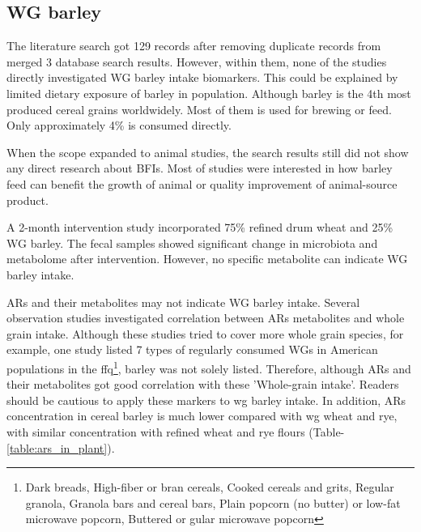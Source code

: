 \subsection{WG barley}
The literature search got 129 records after removing duplicate records from merged 3 database search results. However, within them, none of the studies directly investigated WG barley intake biomarkers. This could be explained by limited dietary exposure of barley in population. Although barley is the 4th most produced cereal grains worldwidely. Most of them is used for brewing or feed. Only approximately 4\% is consumed directly\cite{Baik2008}.

When the scope expanded to animal studies, the search results still did not show any direct research about BFIs. Most of studies were interested in how barley feed can benefit the growth of animal or quality improvement of animal-source product\cite{ISI:000272990200002,Foster2003}.

A 2-month intervention study\cite{DeAngelis2015} incorporated 75\% refined drum wheat and 25\% WG barley. The fecal samples showed significant change in microbiota and metabolome after intervention\cite{DeAngelis2015}. However, no specific metabolite can indicate WG barley intake.

ARs and their metabolites may not indicate WG barley intake. Several observation studies\cite{ISI:000309032000011,ISI:000259554500019} investigated correlation between ARs metabolites and whole grain intake. Although these studies tried to cover more whole grain species, for example, one study\cite{ISI:000259554500019} listed 7 types of regularly consumed WGs in American populations in the \acrfull{ffq}\footnote{Dark breads, High-fiber or bran cereals, Cooked cereals and grits, Regular granola, Granola bars and cereal bars, Plain popcorn (no butter) or low-fat microwave popcorn, Buttered or gular microwave popcorn}, barley was not solely listed. Therefore, although ARs and their metabolites got good correlation with these 'Whole-grain intake'. Readers should be cautious to apply these markers to \acrshort{wg} barley intake. In addition, ARs concentration in cereal barley is much lower compared with \acrshort{wg} wheat and rye, with similar concentration with refined wheat and rye flours (Table-\ref{table:ars_in_plant}). 

